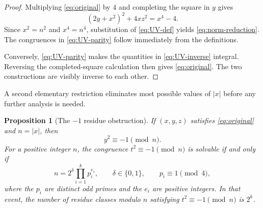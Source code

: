 \documentclass[a4paper,11pt]{amsart}
\newtheorem{proposition}[proposition]{Proposition}
\theoremstyle{definition}
\theoremstyle{remark}
\begin{document}
\begin{proof}
Multiplying \eqref{eq:original} by $4$ and completing the square in $y$ gives
\[
(2y+x^2)^2+4xz^2=x^4-4.
\]
Since $x^2=n^2$ and $x^4=n^4$, substitution of \eqref{eq:UV-def} yields \eqref{eq:norm-reduction}.  The congruences in \eqref{eq:UV-parity} follow immediately from the definitions.

Conversely, \eqref{eq:UV-parity} makes the quantities in \eqref{eq:UV-inverse} integral.  Reversing the completed-square calculation then gives \eqref{eq:original}.  The two constructions are visibly inverse to each other.
\end{proof}

A second elementary restriction eliminates most possible values of $|x|$ before any further analysis is needed.

\begin{proposition}[The $-1$ residue obstruction]\label{prop:residue-obstruction}
If $(x,y,z)$ satisfies \eqref{eq:original} and $n=|x|$, then
\begin{equation}\label{eq:y-root-minus-one}
y^2\equiv-1\pmod n.
\end{equation}
For a positive integer $n$, the congruence $t^2\equiv-1\pmod n$ is solvable if and only if
\begin{equation}\label{eq:n-form}
n=2^\delta\prod_{i=1}^k p_i^{e_i},
\qquad
\delta\in\{0,1\},
\qquad
p_i\equiv1\pmod4,
\end{equation}
where the $p_i$ are distinct odd primes and the $e_i$ are positive integers.  In that event, the number of residue classes modulo $n$ satisfying $t^2\equiv-1\pmod n$ is $2^k$.
\end{proposition}
\end{document}
